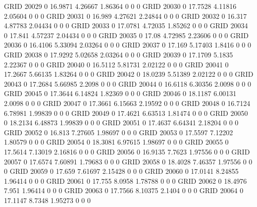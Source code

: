 GRID    20029   0       16.9871 4.26667 1.86364 0       0       0       
GRID    20030   0       17.7528 4.11816 2.05604 0       0       0       
GRID    20031   0       16.989  4.27621 2.24844 0       0       0       
GRID    20032   0       16.317  4.87783 2.04434 0       0       0       
GRID    20033   0       17.0781 4.72035 1.85262 0       0       0       
GRID    20034   0       17.841  4.57237 2.04434 0       0       0       
GRID    20035   0       17.08   4.72985 2.23606 0       0       0       
GRID    20036   0       16.4106 5.33094 2.03264 0       0       0       
GRID    20037   0       17.169  5.17403 1.8416  0       0       0       
GRID    20038   0       17.9292 5.02658 2.03264 0       0       0       
GRID    20039   0       17.1709 5.1835  2.22367 0       0       0       
GRID    20040   0       16.5112 5.81731 2.02122 0       0       0       
GRID    20041   0       17.2667 5.66135 1.83264 0       0       0       
GRID    20042   0       18.0239 5.51389 2.02122 0       0       0       
GRID    20043   0       17.2684 5.66985 2.2098  0       0       0       
GRID    20044   0       16.6118 6.30356 2.0098  0       0       0       
GRID    20045   0       17.3644 6.14824 1.82369 0       0       0       
GRID    20046   0       18.1187 6.00131 2.0098  0       0       0       
GRID    20047   0       17.3661 6.15663 2.19592 0       0       0       
GRID    20048   0       16.7124 6.78981 1.99839 0       0       0       
GRID    20049   0       17.4621 6.63513 1.81474 0       0       0       
GRID    20050   0       18.2134 6.48873 1.99839 0       0       0       
GRID    20051   0       17.4637 6.64341 2.18204 0       0       0       
GRID    20052   0       16.813  7.27605 1.98697 0       0       0       
GRID    20053   0       17.5597 7.12202 1.80579 0       0       0       
GRID    20054   0       18.3081 6.97615 1.98697 0       0       0       
GRID    20055   0       17.5614 7.13019 2.16816 0       0       0       
GRID    20056   0       16.9135 7.7623  1.97556 0       0       0       
GRID    20057   0       17.6574 7.60891 1.79683 0       0       0       
GRID    20058   0       18.4028 7.46357 1.97556 0       0       0       
GRID    20059   0       17.659  7.61697 2.15428 0       0       0       
GRID    20060   0       17.0141 8.24855 1.96414 0       0       0       
GRID    20061   0       17.755  8.0958  1.78788 0       0       0       
GRID    20062   0       18.4976 7.951   1.96414 0       0       0       
GRID    20063   0       17.7566 8.10375 2.1404  0       0       0       
GRID    20064   0       17.1147 8.7348  1.95273 0       0       0       
